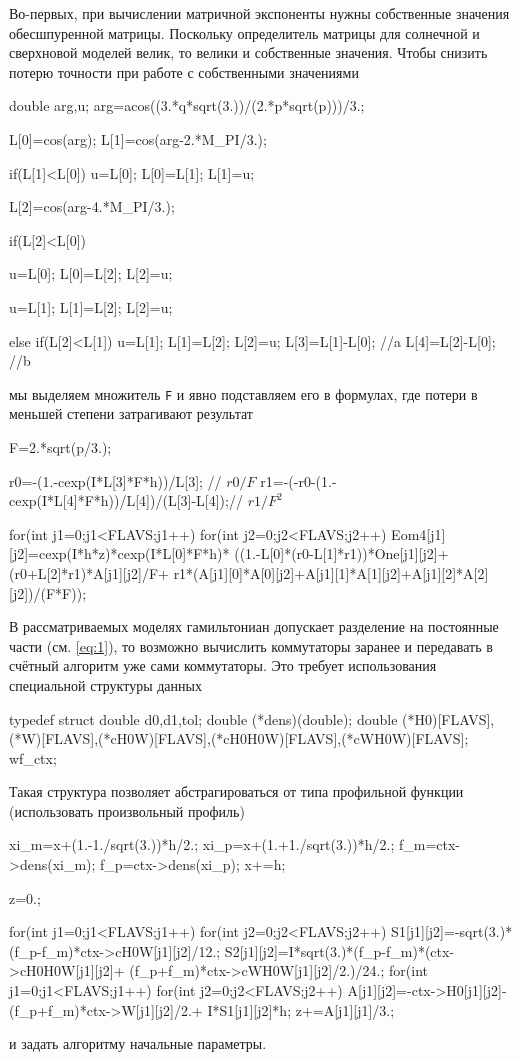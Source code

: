 \documentclass[12pt]{article}
\begin{document}
Во-первых, при вычислении матричной экспоненты нужны собственные значения
обесшпуренной матрицы. Поскольку определитель матрицы для солнечной и сверхновой
моделей велик, то велики и собственные значения. Чтобы снизить потерю точности
при работе с собственными значениями
\begin{Ccode}
  double arg,u;
  arg=acos((3.*q*sqrt(3.))/(2.*p*sqrt(p)))/3.;

  L[0]=cos(arg);
  L[1]=cos(arg-2.*M_PI/3.);

  if(L[1]<L[0])
  {
    u=L[0];
    L[0]=L[1];
    L[1]=u;
  }
  
  L[2]=cos(arg-4.*M_PI/3.);

  if(L[2]<L[0])
  {
    u=L[0];
    L[0]=L[2];
    L[2]=u;

    u=L[1];
    L[1]=L[2];
    L[2]=u;
  }
  else
    if(L[2]<L[1])
    {
      u=L[1];
      L[1]=L[2];
      L[2]=u;
    }
  L[3]=L[1]-L[0]; //a
  L[4]=L[2]-L[0]; //b
\end{Ccode}
мы выделяем множитель \verb|F| и явно подставляем его в формулах, где потери в
меньшей степени затрагивают результат
\begin{Ccode}
  F=2.*sqrt(p/3.);

  r0=-(1.-cexp(I*L[3]*F*h))/L[3]; // \(r0/F\)
  r1=-(-r0-(1.-cexp(I*L[4]*F*h))/L[4])/(L[3]-L[4]);// \(r1/F^2\)

  for(int j1=0;j1<FLAVS;j1++)
    for(int j2=0;j2<FLAVS;j2++)
    {
      Eom4[j1][j2]=cexp(I*h*z)*cexp(I*L[0]*F*h)*
      ((1.-L[0]*(r0-L[1]*r1))*One[j1][j2]+
      (r0+L[2]*r1)*A[j1][j2]/F+
      r1*(A[j1][0]*A[0][j2]+A[j1][1]*A[1][j2]+A[j1][2]*A[2][j2])/(F*F));
    }
\end{Ccode}

В рассматриваемых моделях гамильтониан допускает разделение на постоянные части
(см. \eqref{eq:1}), то возможно вычислить коммутаторы заранее и передавать в
счётный алгоритм уже сами коммутаторы. Это требует использования специальной
структуры данных
\begin{Ccode}
  typedef struct
  {
    double d0,d1,tol;
    double (*dens)(double);
    double (*H0)[FLAVS],(*W)[FLAVS],(*cH0W)[FLAVS],(*cH0H0W)[FLAVS],(*cWH0W)[FLAVS];  
  } wf_ctx;
\end{Ccode}
Такая структура позволяет абстрагироваться от типа профильной функции
(использовать произвольный профиль)
\begin{Ccode}
  xi_m=x+(1.-1./sqrt(3.))*h/2.;
  xi_p=x+(1.+1./sqrt(3.))*h/2.;
  f_m=ctx->dens(xi_m);
  f_p=ctx->dens(xi_p);
  x+=h;
  
  z=0.;
    
  for(int j1=0;j1<FLAVS;j1++)
    for(int j2=0;j2<FLAVS;j2++)
    {
      S1[j1][j2]=-sqrt(3.)*(f_p-f_m)*ctx->cH0W[j1][j2]/12.;
      S2[j1][j2]=I*sqrt(3.)*(f_p-f_m)*(ctx->cH0H0W[j1][j2]+
                 (f_p+f_m)*ctx->cWH0W[j1][j2]/2.)/24.;
    }
  for(int j1=0;j1<FLAVS;j1++)
  {
    for(int j2=0;j2<FLAVS;j2++)
    {
      A[j1][j2]=-ctx->H0[j1][j2]-(f_p+f_m)*ctx->W[j1][j2]/2.+
      I*S1[j1][j2]*h;
    }
    z+=A[j1][j1]/3.;
  }
\end{Ccode}
и задать алгоритму начальные параметры.
\end{document}
